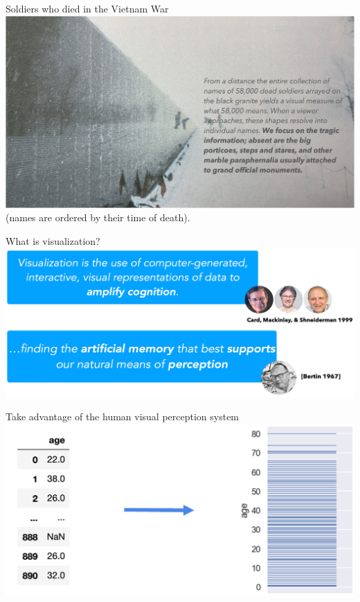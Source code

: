 \documentclass[aspectratio=169]{../latex_main/tntbeamer}  %
\begin{document}
	
	
    \begin{frame}{Soldiers who died in the Vietnam War}
	    \centering
	    \includegraphics[scale=.5]{Bild4}\\
	     (names are ordered by their time of death).
	\end{frame}



    \begin{frame}{What is visualization?}
	    \centering
	    \includegraphics[scale=.45]{Bild5}
	\end{frame}
	
	
	\begin{frame}{Take advantage of the human visual perception system}
	    \centering
	    \includegraphics[scale=.4]{Bild6}
	\end{frame}
	
\end{document}
